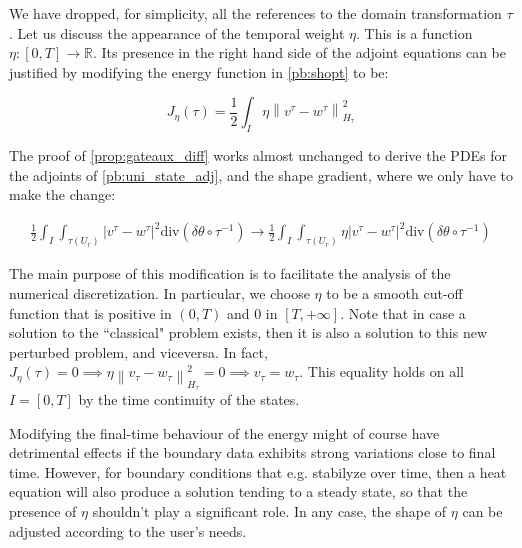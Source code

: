\documentclass[english,a4paper,10pt,oneside]{scrbook}	%
\theoremstyle{break}
\theoremstyle{remark}
\newcommand{\mR}{\mathbb{R}}
\newcommand{\norm}[1]{\left\lVert#1\right\rVert}
\newcommand{\te}{\theta}
\newcommand{\dive}{\text{div}}
\begin{document}
We have dropped, for simplicity, all the references to the domain transformation $\tau$. Let us discuss the appearance of the temporal weight $\eta$. This is a function $\eta: [0,T] \rightarrow \mR$.
Its presence in the right hand side of the adjoint equations can be justified by modifying the energy function in \cref{pb:shopt} to be:

$$J_\eta(\tau) = \frac{1}{2} \int_I \eta \norm{v^\tau - w^\tau}_{H_\tau}^2$$

The proof of \cref{prop:gateaux_diff} works almost unchanged to derive the PDEs for the adjoints of \cref{pb:uni_state_adj}, and the shape gradient, where we only have to make the change:

\begin{align*}
\frac{1}{2}\int_I\int_{\tau(U_r)}|v^\tau-w^\tau|^2\dive(\delta \te\circ  \tau^{-1}) \rightarrow \frac{1}{2}\int_I\int_{\tau(U_r)}\eta|v^\tau-w^\tau|^2\dive(\delta \te\circ  \tau^{-1})
\end{align*} 



The main purpose of this modification is to facilitate the analysis of the numerical discretization. In particular, we choose $\eta$ to be a smooth cut-off function that is positive in $(0,T)$ and $0$ in $[T, +\infty]$. Note that in case a solution to the ``classical" problem exists, then it is also a solution to this new  perturbed problem, and viceversa. In fact, $J_\eta(\tau)=0 \implies \eta \norm{v_\tau - w_\tau}_{H_\tau}^2=0 \implies v_\tau = w_\tau$. This equality holds on all $I=[0,T]$ by the time continuity of the states.

Modifying the final-time behaviour of the energy might of course have detrimental effects if the boundary data exhibits strong variations close to final time. However, for boundary conditions that e.g. stabilyze over time, then a heat equation will also produce a solution tending to a steady state, so that the presence of $\eta$ shouldn't play a significant role. In any case, the shape of $\eta$ can be adjusted according to the user's needs.
\end{document}

